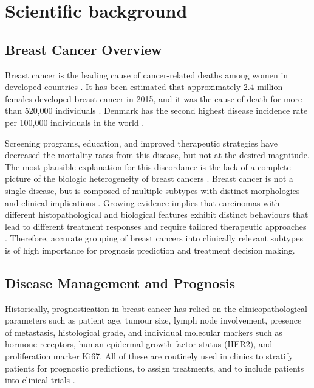 


\section{Scientific background}

    \subsection{Breast Cancer Overview}
   
    Breast cancer is the leading cause of cancer-related deaths among women in developed countries \cite{ferlay2015cancer}. It has been estimated that approximately 2.4 million females developed breast cancer in 2015, and it was the cause of death for more than 520,000 individuals \cite{Fitzmaurice2017Global2015}.  Denmark has the second highest disease incidence rate per 100,000 individuals in the world \cite{2015BreastInternational}. 
    
    Screening programs, education, and improved therapeutic strategies have decreased the mortality rates from this disease, but not at the desired magnitude. The most plausible explanation for this discordance is the lack of a complete picture of the biologic heterogeneity of breast cancers \cite{Vidal2017}.
    Breast cancer is not a single disease, but is composed of multiple subtypes with distinct morphologies and clinical implications \cite{Dai2015}. Growing evidence implies that carcinomas with different histopathological and biological features exhibit distinct behaviours that lead to different treatment responses and require tailored therapeutic approaches \cite{Blows2010}. Therefore, accurate grouping of breast cancers into clinically relevant subtypes is of high importance for prognosis prediction and treatment decision making.

    \subsection{Disease Management and Prognosis}
    
    Historically, prognostication in breast cancer has relied on the clinicopathological parameters such as patient age, tumour size, lymph node involvement, presence of metastasis, histological grade, and individual molecular markers such as hormone receptors, human epidermal growth factor status (HER2), and proliferation marker Ki67. All of these are routinely used in clinics to stratify patients for prognostic predictions, to assign treatments, and to include patients into clinical trials \cite{Vidal2017}.

